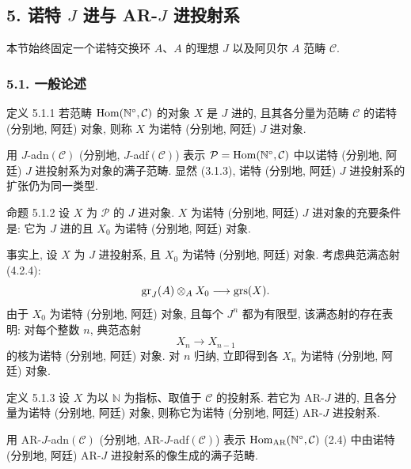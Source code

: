 \subsection*{5. 诺特 \(J\) 进与 AR-\(J\) 进投射系}

本节始终固定一个诺特交换环 \(A\)、\(A\) 的理想 \(J\) 以及阿贝尔 \(A\) 范畴 \(\mathcal C\).

\subsubsection*{5.1. 一般论述}

\begin{statement}{定义 5.1.1}
若范畴 \(\operatorname{Hom}(\mathbb N^\circ,\mathcal C)\) 的对象 \(X\) 是 \(J\) 进的, 且其各分量为范畴 \(\mathcal C\) 的诺特 (分别地, 阿廷) 对象, 则称 \(X\) 为诺特 (分别地, 阿廷) \(J\) 进对象.
\end{statement}

用 \(J\)-adn\((\mathcal C)\) (分别地, \(J\)-adf\((\mathcal C)\)) 表示
\(\mathcal P=\operatorname{Hom}(\mathbb N^\circ,\mathcal C)\) 中以诺特 (分别地, 阿廷) \(J\) 进投射系为对象的满子范畴. 显然 (3.1.3), 诺特 (分别地, 阿廷) \(J\) 进投射系的扩张仍为同一类型.

\begin{statement}{命题 5.1.2}
设 \(X\) 为 \(\mathcal P\) 的 \(J\) 进对象. \(X\) 为诺特 (分别地, 阿廷) \(J\) 进对象的充要条件是: 它为 \(J\) 进的且 \(X_0\) 为诺特 (分别地, 阿廷) 对象.
\end{statement}

\begin{prooftext}
事实上, 设 \(X\) 为 \(J\) 进投射系, 且 \(X_0\) 为诺特 (分别地, 阿廷) 对象. 考虑典范满态射 (4.2.4):
\[
\operatorname{gr}_J(A)\otimes_A X_0\longrightarrow \operatorname{grs}(X).
\]
由于 \(X_0\) 为诺特 (分别地, 阿廷) 对象, 且每个 \(J^n\) 都为有限型, 该满态射的存在表明: 对每个整数 \(n\), 典范态射
\[
X_n\longrightarrow X_{n-1}
\]
的核为诺特 (分别地, 阿廷) 对象. 对 \(n\) 归纳, 立即得到各 \(X_n\) 为诺特 (分别地, 阿廷) 对象.
\end{prooftext}

\begin{statement}{定义 5.1.3}
设 \(X\) 为以 \(\mathbb N\) 为指标、取值于 \(\mathcal C\) 的投射系. 若它为 AR-\(J\) 进的, 且各分量为诺特 (分别地, 阿廷) 对象, 则称它为诺特 (分别地, 阿廷) AR-\(J\) 进投射系.
\end{statement}

用 AR-\(J\)-adn\((\mathcal C)\) (分别地, AR-\(J\)-adf\((\mathcal C)\)) 表示 \(\operatorname{Hom}_{\mathrm{AR}}(\mathbb N^\circ,\mathcal C)\) (2.4) 中由诺特 (分别地, 阿廷) AR-\(J\) 进投射系的像生成的满子范畴.

